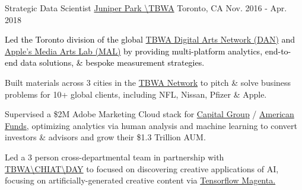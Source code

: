 \begin{cventries}
	\cventry
	{Strategic Data Scientist} %
	{\href{https://www.juniperparktbwa.com/}{Juniper Park \textbackslash  TBWA}} %
	{Toronto, CA} %
	{Nov. 2016 - Apr. 2018} %
	{
		\textcolor{black}{Led the Toronto division of the global \href{https://www.digitalartsnetwork.com/}{TBWA Digital Arts Network (DAN)} and \href{https://www.mediaartslab.com/}{Apple's Media Arts Lab (MAL)} by providing multi-platform analytics, end-to-end data solutions, \& bespoke measurement strategies.}
		\textcolor{text}{
			\begin{cvitems} %
				\item {Built materials across 3 cities in the \href{https://tbwa.com/}{TBWA Network} to pitch \& solve business problems for 10+ global clients, including NFL, Nissan, Pfizer \& Apple.}
				\item {Supervised a \$2M Adobe Marketing Cloud stack for \href{https://www.capitalgroup.com/}{Capital Group} / \href{https://www.capitalgroup.com/advisor/}{American Funds}, optimizing analytics via human analysis and machine learning to convert investors \& advisors and grow their \$1.3 Trillion AUM.}
				\item {Led a 3 person cross-departmental team in partnership with \href{http://tbwachiatday.com/}{TBWA\textbackslash CHIAT\textbackslash DAY} to focused on discovering creative applications of AI, focusing on artificially-generated creative content via \href{https://magenta.tensorflow.org}{Tensorflow Magenta.}}
			\end{cvitems}
			\newline
		}
	}


\end{cventries}
